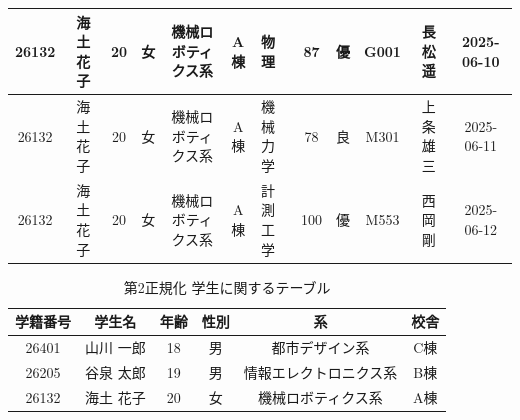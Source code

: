 \documentclass[a4paper,11pt]{ltjsarticle}
\begin{document}
\begin{table}[htbp]
{\begin{tabular}{|c|c|c|c|c|c|l|c|c|c|c|c|}
      26132         & 海土 花子        & 20          & 女           & 機械ロボティクス系   & A棟          & 物理           & 87          & 優           & G001           & 長松 遥         & 2025-06-10   \\
      \hline
      26132         & 海土 花子        & 20          & 女           & 機械ロボティクス系   & A棟          & 機械力学         & 78          & 良           & M301           & 上条 雄三        & 2025-06-11   \\
      \hline
      26132         & 海土 花子        & 20          & 女           & 機械ロボティクス系   & A棟          & 計測工学         & 100         & 優           & M553           & 西岡 剛         & 2025-06-12   \\
      \hline
    \end{tabular}
  }
\end{table}
\begin{table}[htbp]
  \centering
  \caption{第2正規化 学生に関するテーブル}
  \label{tab:normalized2_student}
  \begin{tabular}{|c|c|c|c|c|c|}
    \hline
    \textbf{学籍番号} & \textbf{学生名} & \textbf{年齢} & \textbf{性別} & \textbf{系}  & \textbf{校舎} \\
    \hline

    26401         & 山川 一郎        & 18          & 男           & 都市デザイン系     & C棟          \\
    \hline

    26205         & 谷泉 太郎        & 19          & 男           & 情報エレクトロニクス系 & B棟          \\
    \hline

    26132         & 海土 花子        & 20          & 女           & 機械ロボティクス系   & A棟          \\
    \hline
  \end{tabular}
\end{table}
\end{document}

